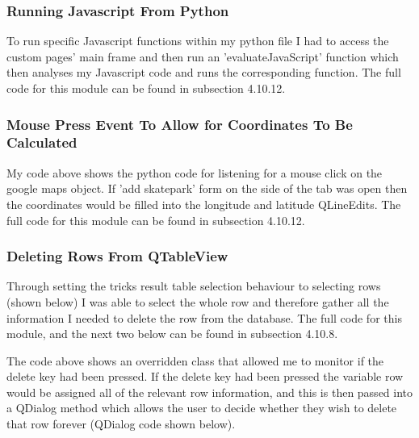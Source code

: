\begin{landscape}
\subsubsection{Running Javascript From Python}

To run specific Javascript functions within my python file I had to access the custom pages' main frame and then run an 'evaluateJavaScript' function which then analyses my Javascript code and runs the corresponding function. The full code for this module can be found in subsection 4.10.12.


\subsubsection{Mouse Press Event To Allow for Coordinates To Be Calculated}

My code above shows the python code for listening for a mouse click on the google maps object. If 'add skatepark' form on the side of the tab was open then the coordinates would be filled into the longitude and latitude QLineEdits. The full code for this module can be found in subsection 4.10.12.



\subsubsection{Deleting Rows From QTableView}

Through setting the tricks result table selection behaviour to selecting rows (shown below) 
I was able to select the whole row and therefore gather all the information I needed to delete the row from the database. The full code for this module, and the next two below can be found in subsection 4.10.8.


The code above shows an overridden class that allowed me to monitor if the delete key had been pressed. If the delete key had been pressed the variable row would be assigned all of the relevant row information, and this is then passed into a QDialog method which allows the user to decide whether they wish to delete that row forever (QDialog code shown below). 



\end{landscape}

